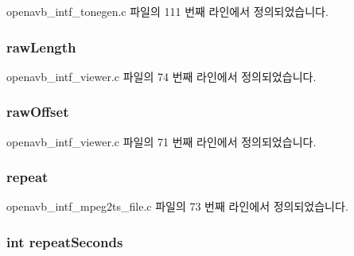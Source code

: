 openavb\+\_\+intf\+\_\+tonegen.\+c 파일의 111 번째 라인에서 정의되었습니다.

\subsubsection[{\texorpdfstring{raw\+Length}{rawLength}}]{ raw\+Length}\hypertarget{structpvt__data__t_a62fc30d384e561d0b39477b2f39312cc}{}\label{structpvt__data__t_a62fc30d384e561d0b39477b2f39312cc}


openavb\+\_\+intf\+\_\+viewer.\+c 파일의 74 번째 라인에서 정의되었습니다.

\subsubsection[{\texorpdfstring{raw\+Offset}{rawOffset}}]{ raw\+Offset}\hypertarget{structpvt__data__t_a1ac7e9377e9fc5768326a5da1ce75cc7}{}\label{structpvt__data__t_a1ac7e9377e9fc5768326a5da1ce75cc7}


openavb\+\_\+intf\+\_\+viewer.\+c 파일의 71 번째 라인에서 정의되었습니다.

\subsubsection[{\texorpdfstring{repeat}{repeat}}]{ repeat}\hypertarget{structpvt__data__t_a98c61ed9410ab805baab005fe7713d9b}{}\label{structpvt__data__t_a98c61ed9410ab805baab005fe7713d9b}


openavb\+\_\+intf\+\_\+mpeg2ts\+\_\+file.\+c 파일의 73 번째 라인에서 정의되었습니다.

\subsubsection[{\texorpdfstring{repeat\+Seconds}{repeatSeconds}}]{\setlength{\rightskip}{0pt plus 5cm}int repeat\+Seconds}\hypertarget{structpvt__data__t_ab5e342262ddb476fbecf6d61dabc12b4}{}\label{structpvt__data__t_ab5e342262ddb476fbecf6d61dabc12b4}


